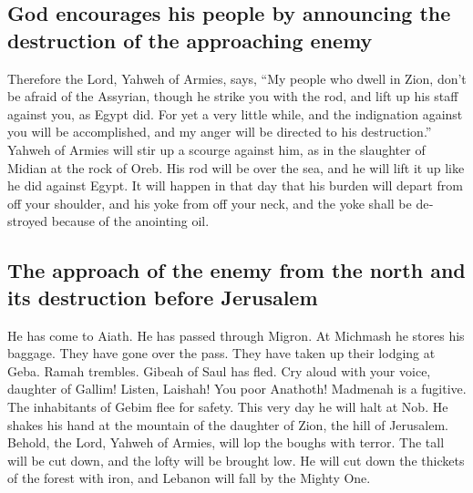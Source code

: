 \begin{paracol}{2}
\begin{otherlanguage}{english}
\hypertarget{god-encourages-his-people-by-announcing-the-destruction-of-the-approaching-enemy}{%
\subsection{God encourages his people by announcing the destruction of
the approaching
enemy}\label{god-encourages-his-people-by-announcing-the-destruction-of-the-approaching-enemy}}

 Therefore the Lord, Yahweh of Armies, says, ``My people
who dwell in Zion, don't be afraid of the Assyrian, though he strike you
with the rod, and lift up his staff against you, as Egypt did.
 For yet a very little while, and the indignation against
you will be accomplished, and my anger will be directed to his
destruction.''  Yahweh of Armies will stir up a scourge
against him, as in the slaughter of Midian at the rock of Oreb. His rod
will be over the sea, and he will lift it up like he did against Egypt.
 It will happen in that day that his burden will depart
from off your shoulder, and his yoke from off your neck, and the yoke
shall be destroyed because of the anointing oil.

\hypertarget{the-approach-of-the-enemy-from-the-north-and-its-destruction-before-jerusalem}{%
\subsection{The approach of the enemy from the north and its destruction
before
Jerusalem}\label{the-approach-of-the-enemy-from-the-north-and-its-destruction-before-jerusalem}}

 He has come to Aiath. He has passed through Migron. At
Michmash he stores his baggage.  They have gone over the
pass. They have taken up their lodging at Geba. Ramah trembles. Gibeah
of Saul has fled.  Cry aloud with your voice, daughter of
Gallim! Listen, Laishah! You poor Anathoth!  Madmenah is
a fugitive. The inhabitants of Gebim flee for safety. 
This very day he will halt at Nob. He shakes his hand at the mountain of
the daughter of Zion, the hill of Jerusalem.  Behold, the
Lord, Yahweh of Armies, will lop the boughs with terror. The tall will
be cut down, and the lofty will be brought low.  He will
cut down the thickets of the forest with iron, and Lebanon will fall by
the Mighty One.

\end{otherlanguage}


\end{paracol}
